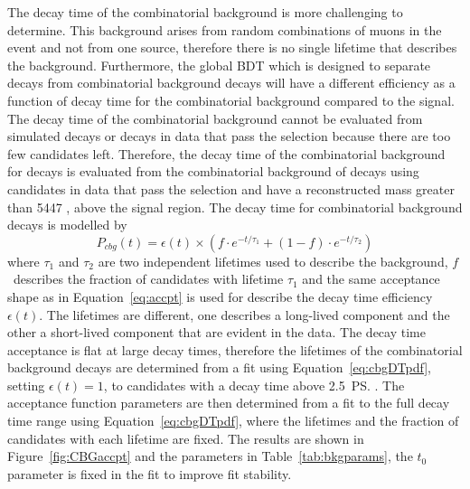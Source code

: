 {The decay time \pdf of the combinatorial background is more challenging to determine. This background arises from random combinations of muons in the event and not from one source, therefore there is no single lifetime that describes the background. Furthermore, the global BDT which is designed to separate \bsmumu decays from combinatorial background decays will have a different efficiency as a function of decay time for the combinatorial background compared to the \bsmum signal. The decay time \pdf of the combinatorial background cannot be evaluated from simulated decays or decays in data that pass the \bsmumu selection because there are too few candidates left. %
Therefore, the decay time \pdf of the combinatorial background for \bsmumu decays is evaluated from the combinatorial background of \bhh decays using candidates in data that pass the \bhh selection and have a reconstructed mass greater than 5447 \mevcc, above the \bs signal region. The decay time \pdf for combinatorial background decays is modelled by
\begin{equation}
P_{cbg}(t) = \epsilon(t)\times \left( f \cdot e^{-t/\tau_{1}} + (1-f)\cdot e^{-t/\tau_{2}} \right)
\label{eq:cbgDTpdf}
\end{equation}
where $\tau_{1}$ and $\tau_{2}$ are two independent lifetimes used to describe the background, $f$~describes the fraction of candidates with lifetime $\tau_{1}$ and the same acceptance shape as in Equation~\ref{eq:accpt} is used for describe the decay time efficiency $\epsilon(t)$. The lifetimes are different, one describes a long-lived component and the other a short-lived component that are evident in the data. The decay time acceptance is flat at large decay times, therefore the lifetimes of the combinatorial background decays are determined from a \ml fit using Equation~\ref{eq:cbgDTpdf}, setting $\epsilon(t)=1$, to candidates with a decay time above 2.5~\ps. The acceptance function parameters are then determined from a \ml fit to the full decay time range using Equation~\ref{eq:cbgDTpdf}, where the lifetimes and the fraction of candidates with each lifetime are fixed. The results are shown in Figure~\ref{fig:CBGaccpt} and the \pdf parameters in Table~\ref{tab:bkgparams}, the $t_{0}$ parameter is fixed in the fit to improve fit stability. 
\begin{table}[tbp]
\begin{center}
\begin{tabular}{lc}

\end{tabular}
\end{center}
\end{table}}
